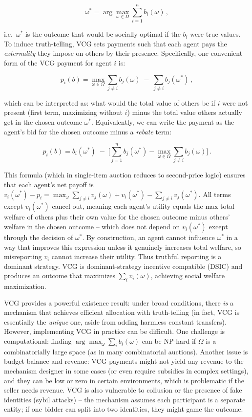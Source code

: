 \documentclass[
  letterpaper,
  numbers=noenddot,
  DIV=11]{scrreprt}
\theoremstyle{definition}
\theoremstyle{plain}
\theoremstyle{plain}
\theoremstyle{remark}
\begin{document}
\[
\omega^* = \arg\max_{\omega \in \Omega} \sum_{i=1}^n b_i(\omega) \,,
\]

i.e.~\(\omega^*\) is the outcome that would be socially optimal if the
\(b_i\) were true values. To induce truth-telling, VCG sets payments
such that each agent pays the \emph{externality} they impose on others
by their presence. Specifically, one convenient form of the VCG payment
for agent \(i\) is:

\[
p_i(b) = \max_{\omega \in \Omega} \sum_{j \neq i} b_j(\omega)\;-\;\sum_{j \neq i} b_j(\omega^*) \,,
\]

which can be interpreted as: what would the total value of others be if
\(i\) were not present (first term, maximizing without \(i\)) minus the
total value others actually get in the chosen outcome \(\omega^*\).
Equivalently, we can write the payment as the agent's bid for the chosen
outcome minus a \emph{rebate} term:

\[
p_i(b) = b_i(\omega^*) \;-\; \Big[\sum_{j=1}^n b_j(\omega^*) - \max_{\omega \in \Omega} \sum_{j \neq i} b_j(\omega)\Big] \,. \tag{4.2}\label{eq-eq3.67}
\]

This formula (which in single-item auction reduces to second-price
logic) ensures that each agent's net payoff is
\(v_i(\omega^*) - p_i = \max_{\omega} \sum_{j\neq i} v_j(\omega) + v_i(\omega^*) - \sum_{j\neq i} v_j(\omega^*)\).
All terms except \(v_i(\omega^*)\) cancel out, meaning each agent's
utility equals the max total welfare of others plus their own value for
the chosen outcome minus others' welfare in the chosen outcome -- which
does not depend on \(v_i(\omega^*)\) except through the decision of
\(\omega^*\). By construction, an agent cannot influence \(\omega^*\) in
a way that improves this expression unless it genuinely increases total
welfare, so misreporting \(v_i\) cannot increase their utility. Thus
truthful reporting is a dominant strategy. VCG is dominant-strategy
incentive compatible (DSIC) and produces an outcome that maximizes
\(\sum_i v_i(\omega)\), achieving social welfare maximization.

VCG provides a powerful existence result: under broad conditions, there
\emph{is} a mechanism that achieves efficient allocation with
truth-telling (in fact, VCG is essentially the \emph{unique} one, aside
from adding harmless constant transfers). However, implementing VCG in
practice can be difficult. One challenge is computational: finding
\(\arg\max_{\omega}\sum_i b_i(\omega)\) can be NP-hard if \(\Omega\) is
a combinatorially large space (as in many combinatorial auctions).
Another issue is budget balance and revenue: VCG payments might not
yield any revenue to the mechanism designer in some cases (or even
require subsidies in complex settings), and they can be low or zero in
certain environments, which is problematic if the seller needs revenue.
VCG is also vulnerable to collusion or the presence of fake identities
(sybil attacks) -- the mechanism assumes each participant is a separate
entity; if one bidder can split into two identities, they might game the
outcome.
\end{document}
